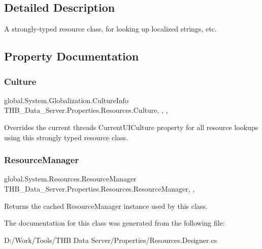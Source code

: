\subsection{Detailed Description}
A strongly-\/typed resource class, for looking up localized strings, etc. 



\subsection{Property Documentation}
\mbox{\label{class_t_h_b___data___server_1_1_properties_1_1_resources_a0f9c72f240b5984d2407f2bab6d3372a}} 
\subsubsection{\texorpdfstring{Culture}{Culture}}
{\footnotesize\ttfamily global.\+System.\+Globalization.\+Culture\+Info T\+H\+B\+\_\+\+Data\+\_\+\+Server.\+Properties.\+Resources.\+Culture\hspace{0.3cm}{\ttfamily [static]}, {\ttfamily [get]}, {\ttfamily [set]}, {\ttfamily [package]}}



Overrides the current thread\textquotesingle{}s Current\+U\+I\+Culture property for all resource lookups using this strongly typed resource class. 

\mbox{\label{class_t_h_b___data___server_1_1_properties_1_1_resources_a1e2436decacf2127dc5f33a45302bb1a}} 
\subsubsection{\texorpdfstring{Resource\+Manager}{ResourceManager}}
{\footnotesize\ttfamily global.\+System.\+Resources.\+Resource\+Manager T\+H\+B\+\_\+\+Data\+\_\+\+Server.\+Properties.\+Resources.\+Resource\+Manager\hspace{0.3cm}{\ttfamily [static]}, {\ttfamily [get]}, {\ttfamily [package]}}



Returns the cached Resource\+Manager instance used by this class. 



The documentation for this class was generated from the following file\+:\begin{DoxyCompactItemize}
\item 
D\+:/\+Work/\+Tools/\+T\+H\+B Data Server/\+Properties/Resources.\+Designer.\+cs\end{DoxyCompactItemize}
